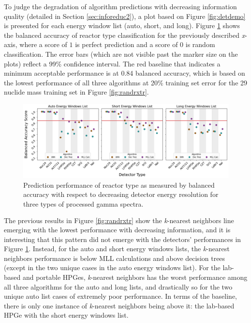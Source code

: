 
To judge the degradation of algorithm predictions with decreasing information
quality (detailed in Section \ref{sec:inforeduc2}), a plot based on Figure
\ref{fig:detdemo} is presented for each energy window list (auto, short, and
long).  Figure \ref{fig:rxtr} shows the balanced accuracy of reactor type
classification for the previously described \textit{x}-axis, where a score of
$1$ is perfect prediction and a score of $0$ is random classification. The
error bars (which are not visible past the marker size on the plots) reflect a
99\% confidence interval.  The red baseline that indicates a minimum acceptable
performance is at 0.84 balanced accuracy, which is based on the lowest
performance of all three algorithms at 20\% training set error for the 29
nuclide mass training set in Figure \ref{fig:randrxtr}.  

\begin{figure}[!htb]
  \centering
  \includegraphics[width=\textwidth]{./chapters/exp2/detector_preds_wrt_enlist_BalAcc_rxtr.png}
  \caption[Prediction performance of reactor type classification with decreasing
           detector energy resolution]
          {Prediction performance of reactor type as measured by balanced 
           accuracy with respect to decreasing detector energy resolution 
           for three types of processed gamma spectra.}
  \label{fig:rxtr}
\end{figure}

The previous results in Figure \ref{fig:randrxtr} show the \textit{k}-nearest
neighbors line emerging with the lowest performance with decreasing
information, and it is interesting that this pattern did not emerge with the
detectors' performances in Figure \ref{fig:rxtr}.  Instead, for the auto and
short energy windows lists, the \textit{k}-nearest neighbors performance is
below \gls{MLL} calculations and above decision trees (except in the two unique
cases in the auto energy windows list).  For the lab-based and portable
\gls{HPGe}s, \textit{k}-nearest neighbors has the worst performance among all
three algorithms for the auto and long lists, and drastically so for the two
unique auto list cases of extremely poor performance.  In terms of the
baseline, there is only one instance of \textit{k}-nearest neighbors being
above it: the lab-based \gls{HPGe} with the short energy windows list. 

